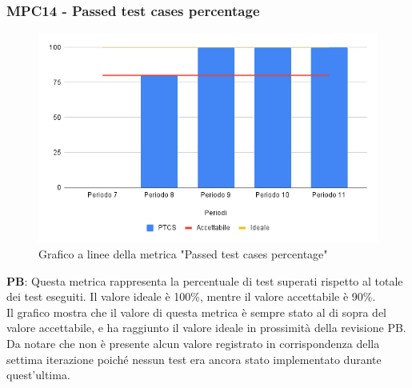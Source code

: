 \documentclass[10pt]{article}
\begin{document}
\begin{justify}
\subsubsection{MPC14 - Passed test cases percentage}

\begin{figure}[H]
  \centering
  \includegraphics[width=0.9\linewidth]{PTCP.png}
  \caption{Grafico a linee della metrica "Passed test cases percentage"}
\end{figure}

\textbf{PB}: Questa metrica rappresenta la percentuale di test superati rispetto al totale dei test eseguiti. Il valore ideale è 100\%, mentre il valore accettabile è 90\%.\\
Il grafico mostra che il valore di questa metrica è sempre stato al di sopra del valore accettabile, e ha raggiunto il valore ideale in prossimità della revisione PB.\\
Da notare che non è presente alcun valore registrato in corrispondenza della settima iterazione poiché nessun test era ancora stato implementato durante quest'ultima.\\

\end{justify}
\end{document}
